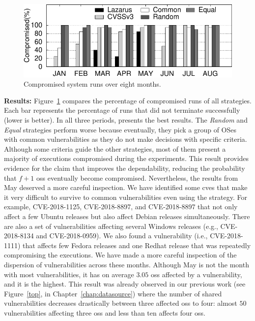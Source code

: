 \begin{figure}[t]
\begin{center}
\includegraphics[width=\columnwidth]{images/gnuplot/executions/execution.pdf}
\caption{Compromised system runs over eight months.}
\label{fig:all_vulns}
\end{center}
\end{figure}


\textbf{Results:} Figure~\ref{fig:all_vulns} compares the percentage of compromised runs of all strategies. 
Each bar represents the percentage of runs that did not terminate successfully (lower is better). 
In all three periods, \system presents the best results. 
The \emph{Random} and \emph{Equal} strategies perform worse because eventually, they pick a group of OSes with common vulnerabilities as they do not make decisions with specific criteria. 
Although some criteria guide the other strategies, most of them present a majority of executions compromised during the experiments.
This result provides evidence for the claim that \system improves the dependability, reducing the probability that $f+1$ \glspl{os} eventually become compromised. 
Nevertheless, the results from May deserved a more careful inspection. 
We have identified some \glspl{cve} that make it very difficult to survive to common vulnerabilities even using the \system strategy.
For example, CVE-2018-1125, CVE-2018-8897, and CVE-2018-8897 that not only affect a few Ubuntu releases but also affect Debian releases simultaneously.
There are also a set of vulnerabilities affecting several Windows releases (e.g., CVE-2018-8134 and CVE-2018-0959). 
We also found a vulnerability (i.e., CVE-2018-1111) that affects few Fedora releases and one Redhat release that was repeatedly compromising the executions.
We have made a more careful inspection of the dispersion of vulnerabilities across these months. 
Although May is not the month with most vulnerabilities, it has on average $3.05$ \glspl{os} affected by a vulnerability, and it is the highest.
This result was already observed in our previous work (see Figure~\ref{top}, in Chapter~\ref{chap:datasource}) where the number of shared vulnerabilities decreases drastically between three affected \glspl{os} to four: almost $50$ vulnerabilities affecting three \glspl{os} and less than ten affects four \glspl{os}. 

